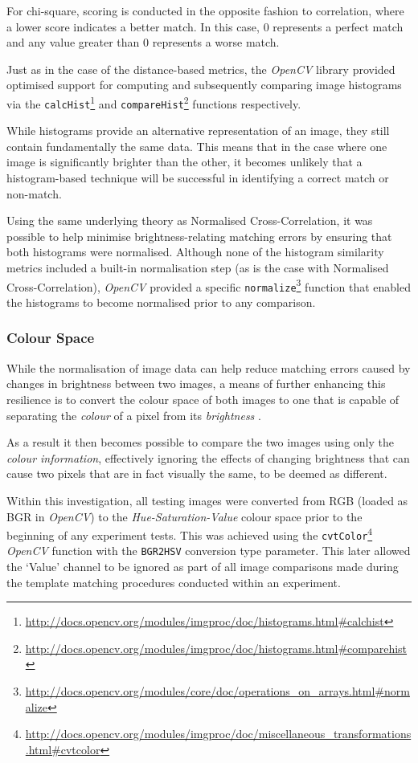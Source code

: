 For chi-square, scoring is conducted in the opposite fashion to correlation, where a lower score indicates a better match. In this case, 0 represents a perfect match and any value greater than 0 represents a worse match.

Just as in the case of the distance-based metrics, the \textit{OpenCV} library provided optimised support for computing and subsequently comparing image histograms via the \texttt{calcHist}\footnote{\url{http://docs.opencv.org/modules/imgproc/doc/histograms.html#calchist}} and \texttt{compareHist}\footnote{\url{http://docs.opencv.org/modules/imgproc/doc/histograms.html#comparehist}} functions respectively. 

While histograms provide an alternative representation of an image, they still contain fundamentally the same data. This means that in the case where one image is significantly brighter than the other, it becomes unlikely that a histogram-based technique will be successful in identifying a correct match or non-match. 

Using the same underlying theory as Normalised Cross-Correlation, it was possible to help minimise brightness-relating matching errors by ensuring that both histograms were normalised. Although none of the histogram similarity metrics included a built-in normalisation step (as is the case with Normalised Cross-Correlation), \textit{OpenCV} provided a specific \texttt{normalize}\footnote{\url{http://docs.opencv.org/modules/core/doc/operations_on_arrays.html#normalize}} function that enabled the histograms to become normalised prior to any comparison.

\subsubsection{Colour Space}

While the normalisation of image data can help reduce matching errors caused by changes in brightness between two images, a means of further enhancing this resilience is to convert the colour space of both images to one that is capable of separating the \textit{colour} of a pixel from its \textit{brightness} \cite{ulrich-nourbakhsh}. 

As a result it then becomes possible to compare the two images using only the \textit{colour information}, effectively ignoring the effects of changing brightness that can cause two pixels that are in fact visually the same, to be deemed as different.

Within this investigation, all testing images were converted from RGB (loaded as BGR in \textit{OpenCV}) to the \textit{Hue-Saturation-Value} colour space prior to the beginning of any experiment tests. This was achieved using the \texttt{cvtColor}\footnote{\url{http://docs.opencv.org/modules/imgproc/doc/miscellaneous_transformations.html#cvtcolor}} \textit{OpenCV} function with the \texttt{BGR2HSV} conversion type parameter. This later allowed the `Value' channel to be ignored as part of all image comparisons made during the template matching procedures conducted within an experiment.

